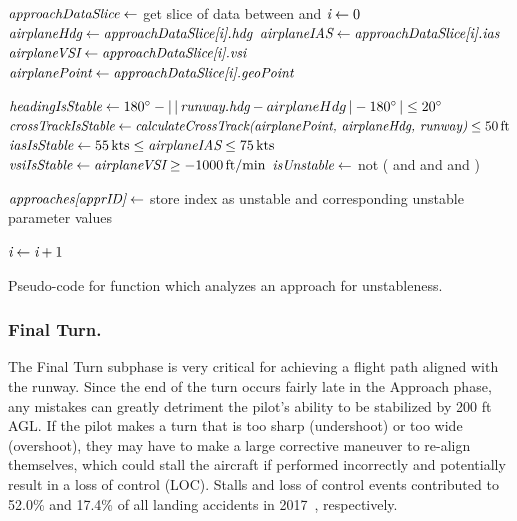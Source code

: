        
        \begin{algorithm}
            \begin{algorithmic}[1]\raggedright
                \State $ \textit{approachDataSlice} \gets $ get slice of data between  and 
                \State $ \textit{i} \gets 0 $
                    \State $ \textit{airplaneHdg} \gets \textit{approachDataSlice[i].hdg} $
                    \State $ \textit{airplaneIAS} \gets \textit{approachDataSlice[i].ias} $
                    \State $ \textit{airplaneVSI} \gets \textit{approachDataSlice[i].vsi} $
                    \State $ \textit{airplanePoint} \gets \textit{approachDataSlice[i].geoPoint} $

                    \State $ \textit{headingIsStable} \gets 180^\circ - \left|\,\left|\,\textit{runway.hdg} - airplaneHdg\,\right| - 180^\circ\,\right| \leq 20^\circ $
                    \State $ \var{crossTrackIsStable} \gets \var{calculateCrossTrack(} \break \var{airplanePoint, airplaneHdg, runway)} \leq 50\,\text{ft} $
                    \State $ \textit{iasIsStable} \gets 55\,\text{kts} \leq \textit{airplaneIAS} \leq 75\,\text{kts} $
                    \State $ \textit{vsiIsStable} \gets \textit{airplaneVSI} \geq -1000\,\text{ft/min} $
                    \State $ \textit{isUnstable} \gets $ not ( and  and  and )

                        \State $ \textit{approaches[apprID]} \gets $ store index as unstable and corresponding unstable parameter values
                    \EndIf

                    \State $ \textit{i} \gets \textit{i} + 1 $
                \EndWhile
            \EndFunction
            \end{algorithmic}
            \caption{Pseudo-code for function which analyzes an approach for unstableness.}
            \label{alg:analyze_approach}
        \end{algorithm}
        
        
        \subsubsection{Final Turn.}
        
        	The Final Turn subphase is very critical for achieving a flight path aligned with the runway.  Since the end of the turn occurs fairly late in the Approach phase, any mistakes can greatly detriment the pilot's ability to be stabilized by 200 ft AGL.  If the pilot makes a turn that is too sharp (undershoot) or too wide (overshoot), they may have to make a large corrective maneuver to re-align themselves, which could stall the aircraft if performed incorrectly and potentially result in a loss of control (LOC).  Stalls and loss of control events contributed to 52.0\% and 17.4\% of all landing accidents in 2017~\cite{kenny201726th}, respectively. 
            
